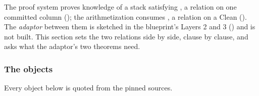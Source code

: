 The proof system proves knowledge of a stack satisfying , a relation on
one committed column (); the arithmetization consumes
, a relation on a Clean 
(). The \emph{adaptor} between them is sketched in the blueprint's
Layers 2 and 3 () and is not built. This section sets the two relations side by
side, clause by clause, and asks what the adaptor's two theorems need.

\subsubsection{The objects}\label{sec:gen-boundary-objects}

Every object below is quoted from the pinned sources.
